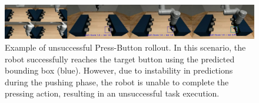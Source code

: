 \begin{figure}[t]
    \centering
    \includegraphics[width=1.0\textwidth]{figures/images/ch3/button_error.jpg}
    \caption{Example of unsuccessful Press-Button rollout. In this scenario, the robot successfully reaches the target button using the predicted bounding box (blue). However, due to instability in predictions during the pushing phase, the robot is unable to complete the pressing action, resulting in an unsuccessful task execution.}
    \label{fig:button_ctod_error}
\end{figure}
